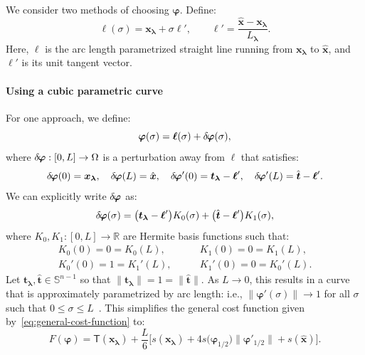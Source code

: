 \documentclass{siamart190516}
\renewcommand{\phi}{\varphi}
\newcommand{\m}[1]{\boldsymbol{#1}}
\newcommand{\xhat}{\hat{\m{x}}}
\newcommand{\xlam}{\m{x}_{\m{\lambda}}}
\newcommand{\that}{\hat{\m{t}}}
\newcommand{\tlam}{\m{t}_{\m{\lambda}}}
\newcommand{\half}{1/2}
\newcommand{\lam}{\m{\lambda}}
\newcommand{\dphi}{\delta\hspace{-0.1em}\m{\phi}}
\newcommand{\mphi}{\m{\phi}}
\newcommand{\mell}{\m{\ell}}
\begin{document}
We consider two methods of choosing $\mphi$. Define:
\begin{equation}
  \mell(\sigma) = \xlam + \sigma \mell', \qquad \mell' = \frac{\xhat - \xlam}{L_{\lam}}.
\end{equation}
Here, $\mell$ is the arc length parametrized straight line running
from $\xlam$ to $\xhat$, and $\mell'$ is its unit tangent vector.

\paragraph{Using a cubic parametric curve}
For one approach, we define:
\begin{equation}
  \mphi(\sigma) = \mell(\sigma) + \dphi(\sigma),
\end{equation}
where $\dphi : [0, L] \to \Omega$ is a perturbation away from
$\mell$ that satisfies:
\begin{equation}
  \dphi(0) = \xlam, \quad \dphi(L) = \xhat, \quad \dphi'(0) = \tlam - \mell', \quad \dphi'(L) = \that - \mell'.
\end{equation}
We can explicitly write $\dphi$ as:
\begin{equation}
  \dphi(\sigma) = \big(\tlam - \mell'\big) K_0(\sigma) + \big(\that - \mell'\big) K_1(\sigma),
\end{equation}
where $K_0, K_1 : [0, L] \to \mathbb{R}$ are Hermite basis functions
such that:
\begin{equation}
  \begin{split}
    K_0(0) = 0 = K_0(L), \qquad &K_1(0) = 0 = K_1(L), \\
    K_0'(0) = 1 = K_1'(L), \qquad &K_1'(0) = 0 = K_0'(L).
  \end{split}
\end{equation}
Let $\tlam, \that \in \mathbb{S}^{n-1}$ so that
$\|\tlam\| = 1 = \|\that\|$.  As $L \to 0$, this results in a curve
that is approximately parametrized by arc length: i.e.,
$\|\mphi'(\sigma)\| \to 1$ for all $\sigma$ such that
$0 \leq \sigma \leq L$~\cite{Floater:2006aa}. This simplifies the
general cost function given by~\eqref{eq:general-cost-function} to:
\begin{equation}
  F(\mphi) = \mathsf{T}(\xlam) + \frac{L}{6} \Big[s(\xlam) + 4 s\big(\mphi_{\half}\big)\big\|\mphi'_{\half}\big\| + s(\xhat)\Big].
\end{equation}
\end{document}
